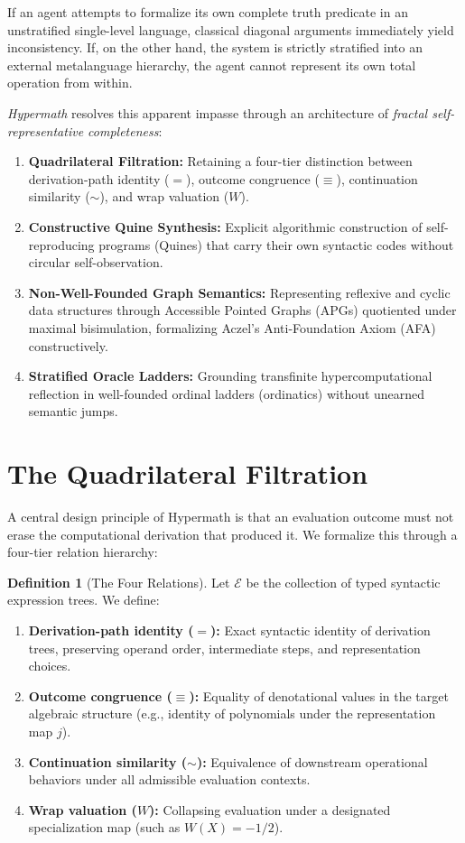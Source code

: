 \documentclass[11pt]{article}
\theoremstyle{definition}
\newtheorem{definition}[theorem]{Definition}
\begin{document}
If an agent attempts to formalize its own complete truth predicate in an unstratified single-level language, classical diagonal arguments immediately yield inconsistency. If, on the other hand, the system is strictly stratified into an external metalanguage hierarchy, the agent cannot represent its own total operation from within.

\emph{Hypermath} resolves this apparent impasse through an architecture of \emph{fractal self-representative completeness}:
\begin{enumerate}
\item \textbf{Quadrilateral Filtration:} Retaining a four-tier distinction between derivation-path identity ($=$), outcome congruence ($\equiv$), continuation similarity ($\sim$), and wrap valuation ($W$).
\item \textbf{Constructive Quine Synthesis:} Explicit algorithmic construction of self-reproducing programs (Quines) that carry their own syntactic codes without circular self-observation.
\item \textbf{Non-Well-Founded Graph Semantics:} Representing reflexive and cyclic data structures through Accessible Pointed Graphs (APGs) quotiented under maximal bisimulation, formalizing Aczel's Anti-Foundation Axiom (AFA) constructively.
\item \textbf{Stratified Oracle Ladders:} Grounding transfinite hypercomputational reflection in well-founded ordinal ladders (ordinatics) without unearned semantic jumps.
\end{enumerate}

\section{The Quadrilateral Filtration}
A central design principle of Hypermath is that an evaluation outcome must not erase the computational derivation that produced it. We formalize this through a four-tier relation hierarchy:

\begin{definition}[The Four Relations]
Let $\mathcal{E}$ be the collection of typed syntactic expression trees. We define:
\begin{enumerate}
\item \textbf{Derivation-path identity ($=$):} Exact syntactic identity of derivation trees, preserving operand order, intermediate steps, and representation choices.
\item \textbf{Outcome congruence ($\equiv$):} Equality of denotational values in the target algebraic structure (e.g., identity of polynomials under the representation map $j$).
\item \textbf{Continuation similarity ($\sim$):} Equivalence of downstream operational behaviors under all admissible evaluation contexts.
\item \textbf{Wrap valuation ($W$):} Collapsing evaluation under a designated specialization map (such as $W(X) = -1/2$).
\end{enumerate}
\end{definition}
\end{document}
